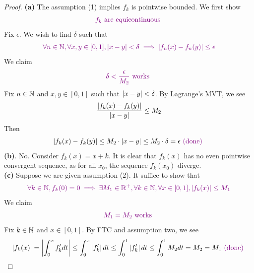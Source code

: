 \documentclass{report}
\begin{document}
\begin{proof}
\textbf{(a)} The assumption (1) implies $f_k$ is pointwise bounded.  We first show 
\begin{align*}
\textcolor{violet}{f_k\text{ are equicontinuous }}
\end{align*}
Fix $\epsilon $. We wish to find $\delta$ such that 
\begin{align*}
  \textcolor{violet}{\forall n \in\mathbb{N}, \forall x,y \in [0,1], \left|x-y\right|<\delta \implies \left|f_n(x)-f_n(y)\right|\leq \epsilon }
\end{align*}
We claim 
\begin{align*}
\textcolor{violet}{\delta < \frac{\epsilon}{M_2}\text{ works }}
\end{align*}
Fix $n\in\mathbb{N}$ and $x,y \in [0,1]$ such that $\left|x-y\right|<\delta$. By Lagrange's MVT, we see 
\begin{align*}
\frac{\left|f_k(x)-f_k(y)\right|}{\left|x-y\right|}\leq M_2
\end{align*}
Then 
\begin{align*}
\left|f_k(x)-f_k(y)\right|\leq M_2\cdot \left|x-y\right|\leq  M_2\cdot \delta =\epsilon \textcolor{violet}{\text{ (done) }}
\end{align*}
\textbf{(b)}. No. Consider $f_k(x)=x+k$. It is clear that $f_k(x)$ has no even pointwise convergent sequence, as for all $x_0$, the sequence  $f_k(x_0)$ diverge.\\

\textbf{(c)} 
Suppose we are given assumption (2). It suffice to show that 
\begin{align*}
  \textcolor{violet}{\forall k\in\mathbb{N},f_k(0)=0\implies \exists M_1\in\mathbb{R}^+, \forall k\in\mathbb{N}, \forall x\in [0,1],\left|f_k(x)\right|\leq M_1}
\end{align*}
We claim 
\begin{align*}
\textcolor{violet}{M_1=M_2\text{ works }}
\end{align*}
Fix $k\in\mathbb{N}$ and $x\in [0,1]$. By FTC and assumption two, we see 
\begin{align*}
\left|f_k(x)\right|=\left|\int_0^x f_k'dt\right|\leq  \int_0^x \left|f_k'\right|dt\leq \int_0^1 \left|f'_k\right|dt\leq \int_0^1 M_2dt=M_2=M_1\textcolor{violet}{\text{ (done) }}
\end{align*}







\end{proof}
\end{document}
